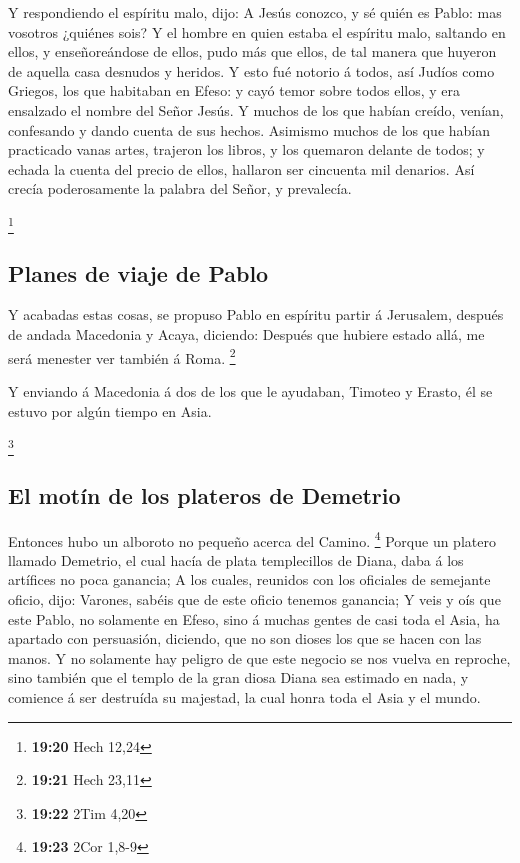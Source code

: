  Y respondiendo el espíritu malo, dijo: A Jesús conozco,
y sé quién es Pablo: mas vosotros ¿quiénes sois?  Y el
hombre en quien estaba el espíritu malo, saltando en ellos, y
enseñoreándose de ellos, pudo más que ellos, de tal manera que huyeron
de aquella casa desnudos y heridos.  Y esto fué notorio á
todos, así Judíos como Griegos, los que habitaban en Efeso: y cayó temor
sobre todos ellos, y era ensalzado el nombre del Señor Jesús.
 Y muchos de los que habían creído, venían, confesando y
dando cuenta de sus hechos.  Asimismo muchos de los que
habían practicado vanas artes, trajeron los libros, y los quemaron
delante de todos; y echada la cuenta del precio de ellos, hallaron ser
cincuenta mil denarios.  Así crecía poderosamente la
palabra del Señor, y prevalecía.

\footnote{\textbf{19:20} Hech 12,24}

\hypertarget{planes-de-viaje-de-pablo}{%
\subsection{Planes de viaje de Pablo}\label{planes-de-viaje-de-pablo}}

 Y acabadas estas cosas, se propuso Pablo en espíritu
partir á Jerusalem, después de andada Macedonia y Acaya, diciendo:
Después que hubiere estado allá, me será menester ver también á Roma.
\footnote{\textbf{19:21} Hech 23,11}

 Y enviando á Macedonia á dos de los que le ayudaban,
Timoteo y Erasto, él se estuvo por algún tiempo en Asia.

\footnote{\textbf{19:22} 2Tim 4,20}

\hypertarget{el-motuxedn-de-los-plateros-de-demetrio}{%
\subsection{El motín de los plateros de
Demetrio}\label{el-motuxedn-de-los-plateros-de-demetrio}}

 Entonces hubo un alboroto no pequeño acerca del Camino.
\footnote{\textbf{19:23} 2Cor 1,8-9}  Porque un platero
llamado Demetrio, el cual hacía de plata templecillos de Diana, daba á
los artífices no poca ganancia;  A los cuales, reunidos
con los oficiales de semejante oficio, dijo: Varones, sabéis que de este
oficio tenemos ganancia;  Y veis y oís que este Pablo, no
solamente en Efeso, sino á muchas gentes de casi toda el Asia, ha
apartado con persuasión, diciendo, que no son dioses los que se hacen
con las manos.  Y no solamente hay peligro de que este
negocio se nos vuelva en reproche, sino también que el templo de la gran
diosa Diana sea estimado en nada, y comience á ser destruída su
majestad, la cual honra toda el Asia y el mundo.

